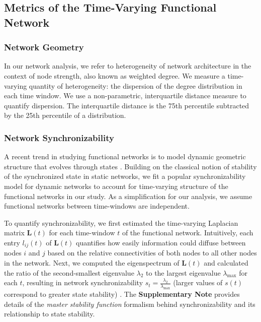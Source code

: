 \subsection{Metrics of the Time-Varying Functional Network}

\subsubsection{Network Geometry}
In our network analysis, we refer to heterogeneity of network architecture in the context of node strength, also known as weighted degree. We measure a time-varying quantity of heterogeneity: the dispersion of the degree distribution in each time window. We use a non-parametric, interquartile distance measure to quantify dispersion. The interquartile distance is the 75th percentile subtracted by the 25th percentile of a distribution.

\subsubsection{Network Synchronizability}
A recent trend in studying functional networks is to model dynamic geometric structure that evolves through states \cite{wulsin2013parsing, rummel2013systems-level, burns2014network}. Building on the classical notion of stability of the synchronized state in static networks, we fit a popular synchronizability model for dynamic networks \cite{gomez2013diffusion} to account for time-varying structure of the functional networks in our study. As a simplification for our analysis, we assume functional networks between time-windows are independent.

To quantify synchronizability, we first estimated the time-varying Laplacian matrix $\textbf{L}(t)$ for each time-window $t$ of the functional network. Intuitively, each entry $l_{ij}(t)$ of $\textbf{L}(t)$ quantifies how easily information could diffuse between nodes $i$ and $j$ based on the relative connectivities of both nodes to all other nodes in the network. Next, we computed the eigenspectrum of $\textbf{L}(t)$ and calculated the ratio of the second-smallest eigenvalue $\lambda_2$ to the largest eigenvalue $\lambda_\text{max}$ for each $t$, resulting in network synchronizability $s_{t}=\frac{\lambda_2}{\lambda_\text{max}}$ (larger values of $s(t)$ correspond to greater state stability) \cite{barahona2002synchronization}. The \textbf{Supplementary Note} provides details of the \textit{master stability function} formalism behind synchronizability and its relationship to state stability. 

